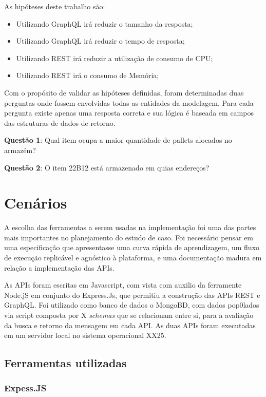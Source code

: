 As hipóteses deste trabalho são: 

\begin{itemize}
\item Utilizando GraphQL irá reduzir o tamanho da resposta;
\item Utilizando GraphQL irá reduzir o tempo de resposta;
\item Utilizando REST irá reduzir a utilização de consumo de CPU;
\item Utilizando REST irá o consumo de Memória;
\end{itemize}

Com o propósito de validar as hipóteses definidas, foram determinadas duas perguntas onde fossem envolvidas todas as entidades da modelagem. Para cada pergunta existe apenas uma resposta correta e sua lógica é baseada em campos das estruturas de dados de retorno.

\textbf{Questão 1}: Qual item ocupa a maior quantidade de pallets alocados no armazém?

\textbf{Questão 2}: O item 22B12 está armazenado em quias endereços?


\section{Cenários} \label{sec:cenarios}

A escolha das ferramentas a serem usadas na implementação foi uma das partes mais importantes no planejamento do estudo de caso. Foi necessário pensar em uma especificação que apresentasse uma curva rápida de aprendizagem, um fluxo de execução replicável e agnóstico à plataforma, e uma documentação madura em relação a implementação das APIs.

As APIs foram escritas em Javascript, com vista  com auxilio da ferramente Node.jS em conjunto do Express.Js, que permitiu a construção das APIs REST e GraphQL. Foi utilizado como banco de dados o MongoBD, com dados pop0lados via script  composta por X \textit{schemas} que se relacionam entre si, para a avaliação da busca e retorno da mensagem em cada API. As duas APIs foram executadas em um servidor local no sistema operacional XX25.

\subsection{Ferramentas utilizadas}

\subsubsection*{Expess.JS}

